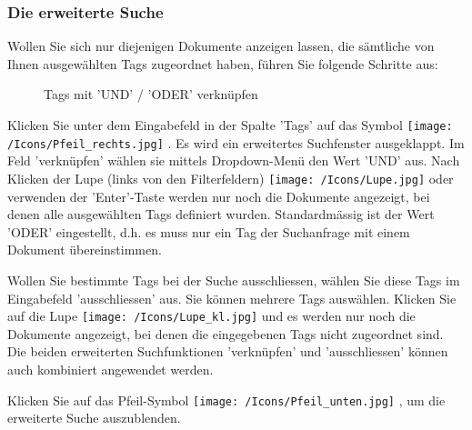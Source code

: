 \subsubsection{Die erweiterte Suche}

Wollen Sie sich nur diejenigen Dokumente anzeigen lassen, die sämtliche von Ihnen ausgewählten Tags zugeordnet haben, führen Sie folgende Schritte aus:

\begin{figure}[H]
\caption{Tags mit 'UND' / 'ODER' verknüpfen}
\end{figure}

Klicken Sie unter dem Eingabefeld in der Spalte 'Tags' auf das Symbol \texttt{[image: /Icons/Pfeil\_rechts.jpg]} . Es wird ein erweitertes Suchfenster ausgeklappt. Im Feld 'verknüpfen'  wählen sie mittels Dropdown-Menü den Wert 'UND'  aus. Nach Klicken der Lupe (links von den Filterfeldern) \texttt{[image: /Icons/Lupe.jpg]}  oder verwenden der 'Enter'-Taste werden nur noch die Dokumente angezeigt, bei denen alle ausgewählten Tags definiert wurden. Standardmässig ist der Wert 'ODER' eingestellt, d.h. es muss nur ein Tag der Suchanfrage mit einem Dokument übereinstimmen. \newline

Wollen Sie bestimmte Tags bei der Suche ausschliessen, wählen Sie diese Tags im Eingabefeld 'ausschliessen'  aus. Sie können mehrere Tags auswählen. Klicken Sie auf die Lupe \texttt{[image: /Icons/Lupe\_kl.jpg]} und es werden nur noch die Dokumente angezeigt, bei denen die eingegebenen Tags nicht zugeordnet sind. Die beiden erweiterten Suchfunktionen 'verknüpfen' und 'ausschliessen' können auch kombiniert angewendet werden.

\vspace{\baselineskip}

Klicken Sie auf das Pfeil-Symbol \texttt{[image: /Icons/Pfeil\_unten.jpg]} , um die erweiterte Suche auszublenden.

